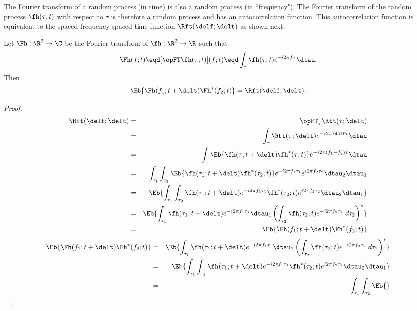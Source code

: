 The Fourier transform of a random process (in time) is also 
a random process (in ``frequency").
The Fourier transform of the random process $\fh(\tau;t)$
with respect to $\tau$ is therefore a random process and has 
an autocorrelation function.
This autocorrelation function is equivalent to 
the spaced-frequency-spaced-time function $\Rft(\delf;\delt)$
as shown next.
\begin{proposition}
Let $\Fh:\R^2\to\C$ be the Fourier transform of $\fh:\R^2\to\R$ 
such that
  \[ \Fh(f;t) \eqd [\opFT \fh(\tau;t)](f;t) 
              \eqd \int_\tau \fh(\tau;t) e^{-i2\pi f\tau}\dtau.
  \]
Then
  \[ \Eb{\Fh(f_1;t+\delt)\Fh^\ast(f_2;t)} = \Rft(\delf;\delt). \]
\end{proposition}
\begin{proof}
\begin{eqnarray*}
   \Rft(\delf;\delt)
     &=& \opFT_\tau \Rtt(\tau;\delt)
   \\&=& \int_{\tau}\Rtt(\tau;\delt) e^{-i2\pi \delf \tau} \dtau
   \\&=& \int_{\tau}\Eb{\fh(\tau;t+\delt) \fh^\ast(\tau;t) }
              e^{-i2\pi (f_1-f_2)\tau}\dtau
   \\&=& \int_{\tau_1}\int_{\tau_2}\Eb{
             \fh(\tau_1;t+\delt) \fh^\ast(\tau_2;t) }
              e^{-i2\pi f_1\tau_1}e^{i2\pi f_2\tau_2} 
            \dtau_2 \dtau_1
   \\&=& \Eb{\int_{\tau_1}\int_{\tau_2}
             \fh     (\tau_1;t+\delt) e^{-i2\pi f_1\tau_1}
             \fh^\ast(\tau_2;t      ) e^{i2\pi f_2\tau_2} 
            \dtau_2 \dtau_1}
   \\&=& \Eb{      \int_{\tau_1}\fh(\tau_1;t+\delt) e^{-i2\pi f_1\tau_1} \dtau_1
             \left(\int_{\tau_2}\fh(\tau_2;t      ) e^{-i2\pi f_2\tau_2} \;d\tau_2\right)^\ast
            }
   \\&=& \Eb{\Fh(f_1;t+\delt)\Fh^\ast(f_2;t)}
\end{eqnarray*}
\fi
\begin{eqnarray*}
   \Eb{\Fh(f_1;t+\delt)\Fh^\ast(f_2;t)}
     &=& \Eb{      \int_{\tau_1}\fh(\tau_1;t+\delt) e^{-i2\pi f_1\tau_1} \dtau_1
             \left(\int_{\tau_2}\fh(\tau_2;t      ) e^{-i2\pi f_2\tau_2} \;d\tau_2\right)^\ast
            }
   \\&=& \Eb{\int_{\tau_1}\int_{\tau_2}
             \fh     (\tau_1;t+\delt) e^{-i2\pi f_1\tau_1}
             \fh^\ast(\tau_2;t      ) e^{i2\pi f_2\tau_2} 
            \dtau_2 \dtau_1}
   \\&=& \int_{\tau_1}\int_{\tau_2}\Eb{
}
\end{eqnarray*}
\end{proof}

